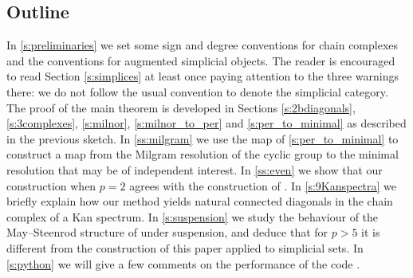 \subsection{Outline}

In \cref{s:preliminaries} we set some sign and degree conventions for chain complexes and the conventions for augmented simplicial objects. The reader is encouraged to read Section \cref{s:simplices} at least once paying attention to the three warnings there: we do not follow the usual convention to denote the simplicial category.
The proof of the main theorem is developed in Sections \ref{s:2bdiagonals}, \ref{s:3complexes}, \ref{s:milnor}, \ref{s:milnor_to_per} and \ref{s:per_to_minimal} as described in the previous sketch.
In \cref{ss:milgram} we use the map of \cref{s:per_to_minimal} to construct a map from the Milgram resolution of the cyclic group to the minimal resolution that may be of independent interest.
In \cref{ss:even} we show that our construction when $p=2$ agrees with the construction of \cite{medina2021fast_sq}.
In \cref{s:9Kanspectra} we briefly explain how our method yields natural connected diagonals in the chain complex of a Kan spectrum.
In \cref{s:suspension} we study the behaviour of the May--Steenrod structure of \cite{medina2021may_st} under suspension, and deduce that for $p>5$ it is different from the construction of this paper applied to simplicial sets.
In \cref{s:python} we will give a few comments on the performance of the code \cite{github-oddp}.